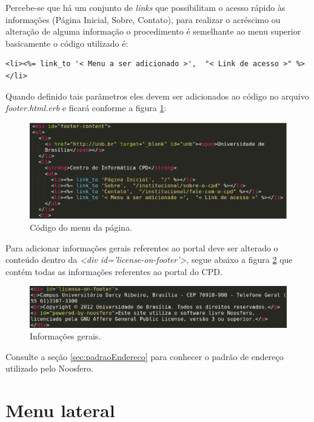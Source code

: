 Percebe-se que há um conjunto de \emph{links} que possibilitam o acesso rápido às informações (Página Inicial, Sobre, Contato), para realizar o acréscimo ou alteração de alguma informação o procedimento é semelhante ao menu superior basicamente o código utilizado é:

\begin{lstlisting}
<li><%= link_to '< Menu a ser adicionado >',  "< Link de acesso >" %></li>
\end{lstlisting}

Quando definido tais parâmetros eles devem ser adicionados ao código no arquivo \emph{footer.html.erb} e ficará conforme a figura \ref{fig:codMenu}:

\begin{figure}[h]
     \centering
       \includegraphics[keepaspectratio=true,scale=0.3]{figuras/footerMenu.eps}
     \caption{Código do menu da página.}
     \label{fig:codMenu}
\end{figure}

\newpage
Para adicionar informações gerais referentes ao portal deve ser alterado o conteúdo dentro da \emph{<div id='license-on-footer'>}, segue abaixo a figura \ref{fig:infGeral} que contém todas as informações referentes ao portal do CPD.

\begin{figure}[h]
     \centering
       \includegraphics[keepaspectratio=true,scale=0.49]{figuras/informacoesGeraisRodape.eps}
     \caption{Informações gerais.}
     \label{fig:infGeral}
\end{figure}

Consulte a seção \ref{sec:padraoEndereco} para conhecer o padrão de endereço utilizado pelo Noosfero.

\section{Menu lateral}


